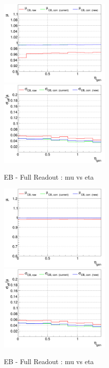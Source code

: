 \begin{figure}
\includegraphics[width=0.495\textwidth]{./ECAL_plots/plotsPU/EB/FULL/pdf/GENETA/EBFULL_GENETA_0020_0100_MuOverBins.pdf}
\includegraphics[width=0.495\textwidth]{./ECAL_plots/plotsPU/EB/FULL/pdf/GENETA/EBFULL_GENETA_0005_0020_EffSigmaOverBins.pdf}
\caption{EB - Full Readout : mu vs eta}
\end{figure}

\begin{figure}
\includegraphics[width=0.495\textwidth]{./ECAL_plots/plotsPU/EB/FULL/pdf/GENETA/EBFULL_GENETA_0100_0300_MuOverBins.pdf}
\includegraphics[width=0.495\textwidth]{./ECAL_plots/plotsPU/EB/FULL/pdf/GENETA/EBFULL_GENETA_0005_0020_EffSigmaOverBins.pdf}
\caption{EB - Full Readout : mu vs eta}
\end{figure}


